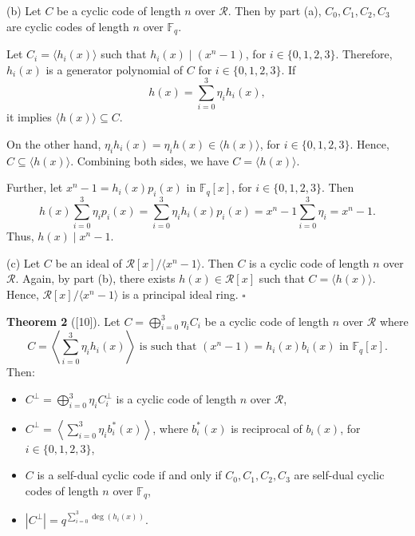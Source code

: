 \documentclass[12pt]{article}
\begin{document}
(b) Let $C$ be a cyclic code of length $n$ over $\mathcal{R}$. Then by part (a), $C_0, C_1, C_2, C_3$ are cyclic codes of length $n$ over $\mathbb{F}_q$.

Let $C_i = \langle h_i(x) \rangle$ such that $h_i(x) \mid (x^n - 1)$, for $i \in \{0, 1, 2, 3\}$. Therefore, $h_i(x)$ is a generator polynomial of $C$ for $i \in \{0, 1, 2, 3\}$. If
\[
h(x) = \sum_{i=0}^3 \eta_i h_i(x),
\]
it implies $\langle h(x) \rangle \subseteq C$.

On the other hand, $\eta_i h_i(x) = \eta_i h(x) \in \langle h(x) \rangle$, for $i \in \{0, 1, 2, 3\}$. Hence, $C \subseteq \langle h(x) \rangle$. Combining both sides, we have $C = \langle h(x) \rangle$.

Further, let $x^n - 1 = h_i(x) p_i(x)$ in $\mathbb{F}_q[x]$, for $i \in \{0, 1, 2, 3\}$. Then
\[
h(x) \sum_{i=0}^3 \eta_i p_i(x) = \sum_{i=0}^3 \eta_i h_i(x) p_i(x) = x^n - 1 \sum_{i=0}^3 \eta_i = x^n - 1.
\]
Thus, $h(x) \mid x^n - 1$.

(c) Let $C$ be an ideal of $\mathcal{R}[x]/\langle x^n - 1 \rangle$. Then $C$ is a cyclic code of length $n$ over $\mathcal{R}$. Again, by part (b), there exists $h(x) \in \mathcal{R}[x]$ such that $C = \langle h(x) \rangle$. Hence, $\mathcal{R}[x]/\langle x^n - 1 \rangle$ is a principal ideal ring. $\square$

\vspace{0.3cm}
\noindent\textbf{Theorem 2} ([10]). Let $C = \bigoplus\limits_{i=0}^3 \eta_i C_i$ be a cyclic code of length $n$ over $\mathcal{R}$ where
\[
C = \left\langle \sum_{i=0}^3 \eta_i h_i(x) \right\rangle \text{ is such that } (x^n - 1) = h_i(x) b_i(x) \text{ in } \mathbb{F}_q[x].
\]
Then:
\begin{itemize}
    \item[(a)] $C^{\perp} = \bigoplus\limits_{i=0}^3 \eta_i C_i^{\perp}$ is a cyclic code of length $n$ over $\mathcal{R}$,
    \item[(b)] $C^{\perp} = \left\langle \sum\limits_{i=0}^3 \eta_i b_i^*(x) \right\rangle$, where $b_i^*(x)$ is reciprocal of $b_i(x)$, for $i \in \{0,1,2,3\}$,
    \item[(c)] $C$ is a self-dual cyclic code if and only if $C_0, C_1, C_2, C_3$ are self-dual cyclic codes of length $n$ over $\mathbb{F}_q$,
    \item[(d)] $|C^{\perp}| = q^{\sum\limits_{i=0}^3 \deg(h_i(x))}$.
\end{itemize}
\end{document}
